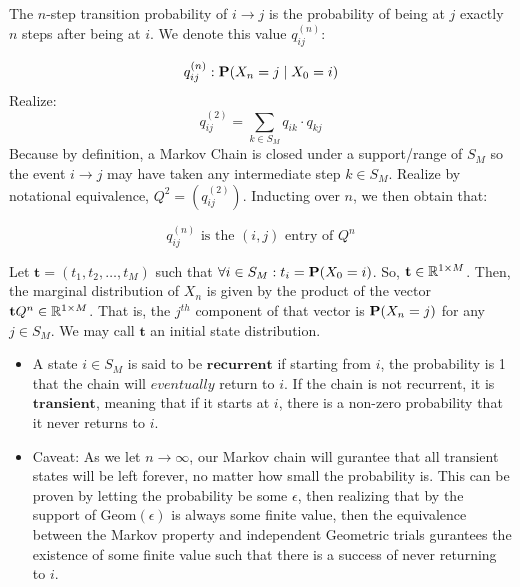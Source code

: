 \begin{definition} The $n$-step transition probability of $i \to j$ is the probability of being at $j$ exactly $n$ steps after being at $i$. We denote this value $q_{ij}^{(n)}:$
\end{definition}

$$ q_{ij}^{(n)}: \Prb(X_n = j \mid X_0 = i)$$
Realize:
$$q_{ij}^{(2)} = \sum_{k \in S_M} q_{ik}\cdot q_{kj}$$
Because by definition, a Markov Chain is closed under a support/range of $S_M$ so the event $i \to j$ may have taken any intermediate step $k \in S_M$. Realize by notational equivalence, $Q^2 = (q_{ij}^{(2)})$. Inducting over $n$, we then obtain that:

$$q_{ij}^{(n)} \text{ is the } (i,j) \text{ entry of } Q^n$$

\begin{definition} Let $\textbf{t} = (t_1,t_2,\dots,t_M)$ such that $\forall i \in S_M : t_i = \Prb(X_0 = i)$. So, $\textbf{t} \in \R^{1 \times M}$. Then, the marginal distribution of $X_n$ is given by the product of the vector $\textbf{t} Q^n \in \R^{1 \times M}$. That is, the $j^{th}$ component of that vector is $\P(X_n = j)$ for any $j \in S_M$. We may call $\textbf{t}$ an initial state distribution.
\end{definition}


\begin{itemize}
\item A state $i \in S_M$ is said to be $\textbf{recurrent}$ if starting from $i$, the probability is 1 that the chain will $\textit{eventually}$ return to $i$. If the chain is not recurrent, it is $\textbf{transient}$, meaning that if it starts at $i$, there is a non-zero probability that it never returns to $i$.

\item Caveat: As we let $n \to \infty$, our Markov chain will gurantee that all transient states will be left forever, no matter how small the probability is. This can be proven by letting the probability be some $\epsilon$, then realizing that by the support of $\text{Geom}(\epsilon)$ is always some finite value, then the equivalence between the Markov property and independent Geometric trials gurantees the existence of some finite value such that there is a success of never returning to $i$.
\end{itemize}

